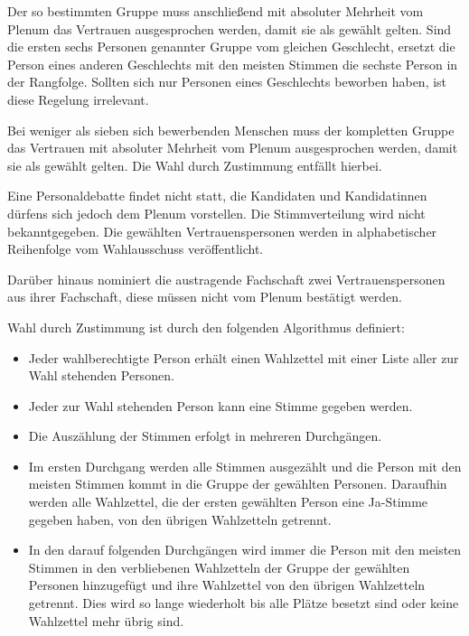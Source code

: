 \documentclass[12pt,oneside]{scrartcl}
\begin{document}
\begin{list}{.}
Der so bestimmten Gruppe muss anschließend mit absoluter Mehrheit vom
Plenum das Vertrauen ausgesprochen werden, damit sie als gewählt gelten.
Sind die ersten sechs Personen genannter Gruppe vom gleichen Geschlecht,
ersetzt die Person eines anderen Geschlechts mit den meisten Stimmen die
sechste Person in der Rangfolge.
Sollten sich nur Personen eines Geschlechts beworben haben, ist diese
Regelung irrelevant.

Bei weniger als sieben sich bewerbenden Menschen muss der kompletten Gruppe
das Vertrauen mit absoluter Mehrheit vom Plenum ausgesprochen werden,
damit sie als gewählt gelten.
Die Wahl durch Zustimmung entfällt hierbei.

Eine Personaldebatte findet nicht statt, die Kandidaten und Kandidatinnen
dürfens sich jedoch dem Plenum vorstellen.
Die Stimmverteilung wird nicht bekanntgegeben.
Die gewählten Vertrauenspersonen werden in alphabetischer Reihenfolge
vom Wahlausschuss veröffentlicht.

Darüber hinaus nominiert die austragende Fachschaft zwei Vertrauenspersonen
aus ihrer Fachschaft, diese müssen nicht vom Plenum bestätigt werden.

\item Wahl durch Zustimmung ist durch den folgenden Algorithmus definiert:
%
\begin{itemize}

\item Jeder wahlberechtigte Person erhält einen Wahlzettel mit einer
Liste aller zur Wahl stehenden Personen.

\item Jeder zur Wahl stehenden Person kann eine Stimme gegeben werden.

\item Die Auszählung der Stimmen erfolgt in mehreren Durchgängen.

\item Im ersten Durchgang werden alle Stimmen ausgezählt und die Person
mit den meisten Stimmen kommt in die Gruppe der gewählten Personen.
Daraufhin werden alle Wahlzettel, die der ersten gewählten Person
eine Ja-Stimme gegeben haben, von den übrigen Wahlzetteln getrennt.

\item In den darauf folgenden Durchgängen wird immer die Person mit den
meisten Stimmen in den verbliebenen Wahlzetteln der Gruppe der gewählten
Personen hinzugefügt und ihre Wahlzettel von den übrigen Wahlzetteln
getrennt. Dies wird so lange wiederholt bis alle Plätze besetzt sind
oder keine Wahlzettel mehr übrig sind.


\end{itemize}
\end{list}
\end{document}
